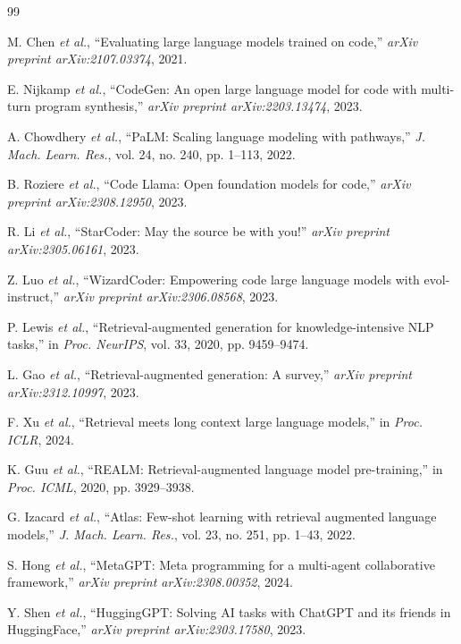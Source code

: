 \documentclass{ieeeaccess}
\begin{document}
\begin{thebibliography}{99}

M. Chen \emph{et al.}, ``Evaluating large language models trained on code,'' \emph{arXiv preprint arXiv:2107.03374}, 2021.

E. Nijkamp \emph{et al.}, ``CodeGen: An open large language model for code with multi-turn program synthesis,'' \emph{arXiv preprint arXiv:2203.13474}, 2023.

A. Chowdhery \emph{et al.}, ``PaLM: Scaling language modeling with pathways,'' \emph{J. Mach. Learn. Res.}, vol. 24, no. 240, pp. 1--113, 2022.

B. Roziere \emph{et al.}, ``Code Llama: Open foundation models for code,'' \emph{arXiv preprint arXiv:2308.12950}, 2023.

R. Li \emph{et al.}, ``StarCoder: May the source be with you!'' \emph{arXiv preprint arXiv:2305.06161}, 2023.

Z. Luo \emph{et al.}, ``WizardCoder: Empowering code large language models with evol-instruct,'' \emph{arXiv preprint arXiv:2306.08568}, 2023.

P. Lewis \emph{et al.}, ``Retrieval-augmented generation for knowledge-intensive NLP tasks,'' in \emph{Proc. NeurIPS}, vol. 33, 2020, pp. 9459--9474.

L. Gao \emph{et al.}, ``Retrieval-augmented generation: A survey,'' \emph{arXiv preprint arXiv:2312.10997}, 2023.

F. Xu \emph{et al.}, ``Retrieval meets long context large language models,'' in \emph{Proc. ICLR}, 2024.

K. Guu \emph{et al.}, ``REALM: Retrieval-augmented language model pre-training,'' in \emph{Proc. ICML}, 2020, pp. 3929--3938.

G. Izacard \emph{et al.}, ``Atlas: Few-shot learning with retrieval augmented language models,'' \emph{J. Mach. Learn. Res.}, vol. 23, no. 251, pp. 1--43, 2022.

S. Hong \emph{et al.}, ``MetaGPT: Meta programming for a multi-agent collaborative framework,'' \emph{arXiv preprint arXiv:2308.00352}, 2024.

Y. Shen \emph{et al.}, ``HuggingGPT: Solving AI tasks with ChatGPT and its friends in HuggingFace,'' \emph{arXiv preprint arXiv:2303.17580}, 2023.


\end{thebibliography}
\end{document}
